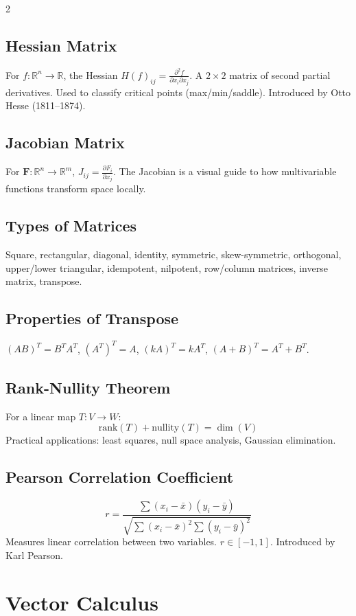 \documentclass[10pt,a4paper]{article}
\begin{document}
\begin{multicols}{2}
\subsection{Hessian Matrix}
For $f:\mathbb{R}^n\to\mathbb{R}$, the Hessian $H(f)_{ij} = \frac{\partial^2 f}{\partial x_i \partial x_j}$. A $2\times2$ matrix of second partial derivatives. Used to classify critical points (max/min/saddle). Introduced by Otto Hesse (1811--1874).

\subsection{Jacobian Matrix}
For $\mathbf{F}:\mathbb{R}^n\to\mathbb{R}^m$, $J_{ij} = \frac{\partial F_i}{\partial x_j}$. The Jacobian is a visual guide to how multivariable functions transform space locally.

\subsection{Types of Matrices}
Square, rectangular, diagonal, identity, symmetric, skew-symmetric, orthogonal, upper/lower triangular, idempotent, nilpotent, row/column matrices, inverse matrix, transpose.

\subsection{Properties of Transpose}
$(AB)^T = B^T A^T$, $(A^T)^T = A$, $(kA)^T = kA^T$, $(A+B)^T = A^T + B^T$.

\subsection{Rank-Nullity Theorem}
For a linear map $T: V \to W$:
\[
\text{rank}(T) + \text{nullity}(T) = \dim(V)
\]
Practical applications: least squares, null space analysis, Gaussian elimination.

\subsection{Pearson Correlation Coefficient}
\[
r = \frac{\sum(x_i - \bar{x})(y_i - \bar{y})}{\sqrt{\sum(x_i-\bar{x})^2 \sum(y_i-\bar{y})^2}}
\]
Measures linear correlation between two variables. $r \in [-1, 1]$. Introduced by Karl Pearson.

\section{Vector Calculus}


\end{multicols}
\end{document}
